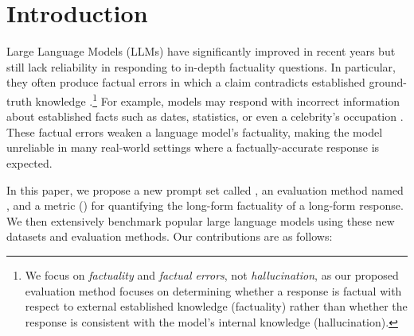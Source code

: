 \documentclass{article}
\theoremstyle{plain}
\theoremstyle{definition}
\theoremstyle{remark}
\begin{document}
\section{Introduction}
\label{sec:Introduction}
Large Language Models (LLMs) have significantly improved in recent years \citep[\textit{inter alia}]{brown2020language,chowdhery2022palm,anil2023palm,openai2023gpt4,gemini2023} but still lack reliability in responding to in-depth factuality questions.
In particular, they often produce factual errors in which a claim contradicts established ground-truth knowledge \citep[\textit{inter-alia}]{huang2023survey,zhang2023siren}.\footnote{We focus on \emph{factuality} and \emph{factual errors}, not \emph{hallucination}, as our proposed evaluation method focuses on determining whether a response is factual with respect to external established knowledge (factuality) rather than whether the response is consistent with the model's internal knowledge (hallucination).}
For example, models may respond with incorrect information about established facts such as dates, statistics, or even a celebrity's occupation \citep{li2023halueval,min2023factscore,muhlgay2023generating}.
These factual errors weaken a language model's factuality, making the model unreliable in many real-world settings where a factually-accurate response is expected.

In this paper, we propose a new prompt set called \longfact{}, an evaluation method named \safe{}, and a metric (\metric{}) for quantifying the long-form factuality of a long-form response.
We then extensively benchmark popular large language models using these new datasets and evaluation methods.
Our contributions are as follows:
\end{document}
